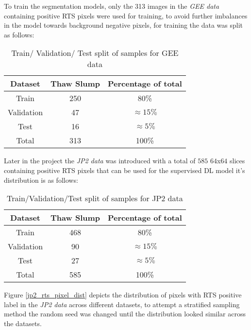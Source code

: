 To train the segmentation models, only the 313 images in the \textit{\gls{GEE} data} containing positive \gls{RTS} pixels were used for training, to avoid further imbalances in the model towards background negative pixels, for training the data was split as follows:
\begin{table}[ht!] 
    \begin{center}
    \begin{tabular}{c|c|c}     
    \textbf{Dataset} & \textbf{Thaw Slump} & \textbf{Percentage of total} \\
    \hline
    Train 
    & 250 & 80\% \\
    \hline
    Validation 
    &  47 & $\approx 15\%$  \\
    \hline
    Test 
    &  16 & $\approx 5\%$ \\
    \hline
    Total 
    &  313 & 100\% \\
    \hline
    \end{tabular}
    \caption{Train/ Validation/ Test split of samples for \gls{GEE} data} \label{table_label_data_gee}
    \end{center}
\end{table}

Later in the project the \textit{\gls{JP2} data} was introduced with a total of $585$ $64$x$64$ slices containing positive \gls{RTS} pixels that can be used for the supervised \gls{DL} model it's distribution is as follows:

\begin{table}[ht!] 
    \begin{center}
    \begin{tabular}{c|c|c}     
    \textbf{Dataset} & \textbf{Thaw Slump} & \textbf{Percentage of total} \\
    \hline
    Train 
    & 468 & 80\% \\
    \hline
    Validation 
    &  90 & $\approx 15\%$  \\
    \hline
    Test 
    &  27 & $\approx 5\%$ \\
    \hline
    Total 
    &  585 & 100\% \\
    \hline
    \end{tabular}
    \end{center}
    \caption{Train/Validation/Test split of samples for \gls{JP2} data} \label{table_label_data_jp2}
\end{table}

Figure \ref{jp2_rts_pixel_dist} depicts the distribution of pixels with \gls{RTS} positive label in the \textit{\gls{JP2} data} across different datasets, to attempt a stratified sampling method the random seed was changed until the distribution looked similar across the datasets.

